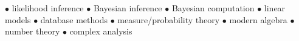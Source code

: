 

$\bullet$ likelihood inference $\bullet$ Bayesian inference $\bullet$ Bayesian computation $\bullet$ linear models $\bullet$ database methods $\bullet$ measure/probability theory $\bullet$ modern algebra $\bullet$ number theory $\bullet$ complex analysis 
